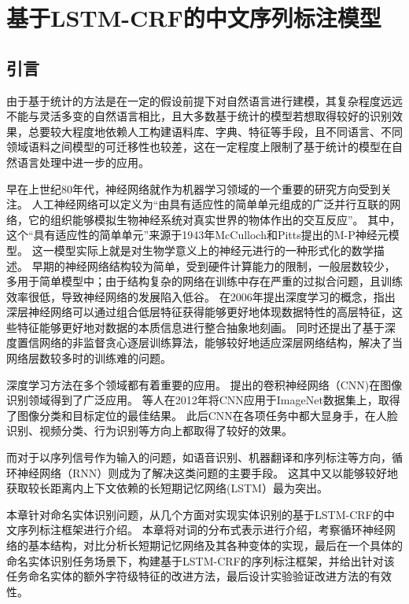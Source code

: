 \chapter{基于LSTM-CRF的中文序列标注模型}
\label{chap:3}
\section{引言}
由于基于统计的方法是在一定的假设前提下对自然语言进行建模，其复杂程度远远不能与灵活多变的自然语言相比，且大多数基于统计的模型若想取得较好的识别效果，总要较大程度地依赖人工构建语料库、字典、特征等手段，且不同语言、不同领域语料之间模型的可迁移性也较差，这在一定程度上限制了基于统计的模型在自然语言处理中进一步的应用。

早在上世纪80年代，神经网络就作为机器学习领域的一个重要的研究方向受到关注。
人工神经网络可以定义为“由具有适应性的简单单元组成的广泛并行互联的网络，它的组织能够模拟生物神经系统对真实世界的物体作出的交互反应”。
其中，这个“具有适应性的简单单元”来源于1943年McCulloch和Pitts提出的M-P神经元模型。
这一模型实际上就是对生物学意义上的神经元进行的一种形式化的数学描述。
早期的神经网络结构较为简单，受到硬件计算能力的限制，一般层数较少，多用于简单模型中；由于结构复杂的网络在训练中存在严重的过拟合问题，且训练效率很低，导致神经网络的发展陷入低谷。
\citet{hinton2009deep}在2006年提出深度学习的概念，指出深层神经网络可以通过组合低层特征获得能够更好地体现数据特性的高层特征，这些特征能够更好地对数据的本质信息进行整合抽象地刻画。
同时还提出了基于深度置信网络的非监督贪心逐层训练算法，能够较好地适应深层网络结构，解决了当网络层数较多时的训练难的问题。

深度学习方法在多个领域都有着重要的应用。
\citet{lecun1998gradient}提出的卷积神经网络（CNN)在图像识别领域得到了广泛应用。
\citet{krizhevsky2012imagenet}等人在2012年将CNN应用于ImageNet数据集上，取得了图像分类和目标定位的最佳结果。
此后CNN在各项任务中都大显身手，在人脸识别、视频分类、行为识别等方向上都取得了较好的效果。

而对于以序列信号作为输入的问题，如语音识别、机器翻译和序列标注等方向，循环神经网络（RNN）则成为了解决这类问题的主要手段。
这其中又以能够较好地获取较长距离内上下文依赖的长短期记忆网络(LSTM）最为突出。

本章针对命名实体识别问题，从几个方面对实现实体识别的基于LSTM-CRF的中文序列标注框架进行介绍。
本章将对词的分布式表示进行介绍，考察循环神经网络的基本结构，对比分析长短期记忆网络及其各种变体的实现，最后在一个具体的命名实体识别任务场景下，构建基于LSTM-CRF的序列标注框架，并给出针对该任务命名实体的额外字符级特征的改进方法，最后设计实验验证改进方法的有效性。

